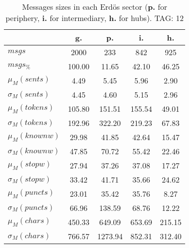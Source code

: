 \begin{table}[h!]
\begin{center}
\begin{tabular}{| l || c | c | c | c |}\hline
 & {\bf g.} & {\bf p.} & {\bf i.} & {\bf h.} \\\hline\hline
$msgs$ & 2000  & 233  & 842  & 925 \\
$msgs_{\%}$ & 100.00  & 11.65  & 42.10  & 46.25 \\\hline
$\mu_M(sents)$ & 4.49  & 5.45  & 5.96  & 2.90 \\
$\sigma_M(sents)$ & 4.45  & 4.60  & 5.15  & 2.96 \\\hline
$\mu_M(tokens)$ & 105.80  & 151.51  & 155.54  & 49.01 \\
$\sigma_M(tokens)$ & 192.96  & 322.20  & 219.23  & 67.83 \\\hline
$\mu_M(knownw)$ & 29.98  & 41.85  & 42.64  & 15.47 \\
$\sigma_M(knownw)$ & 47.85  & 70.72  & 55.42  & 22.46 \\\hline
$\mu_M(stopw)$ & 27.94  & 37.26  & 37.08  & 17.27 \\
$\sigma_M(stopw)$ & 33.42  & 41.71  & 35.66  & 24.62 \\\hline
$\mu_M(puncts)$ & 23.01  & 35.42  & 35.76  & 8.27 \\
$\sigma_M(puncts)$ & 66.96  & 138.59  & 68.76  & 12.22 \\\hline
$\mu_M(chars)$ & 450.33  & 649.09  & 653.69  & 215.15 \\
$\sigma_M(chars)$ & 766.57  & 1273.94  & 852.31  & 312.40 \\\hline
\end{tabular}
\caption{Messages sizes in each Erd\"os sector ({{\bf p.}} for periphery, {{\bf i.}} for intermediary, {{\bf h.}} for hubs). TAG: 12}
\end{center}
\end{table}
